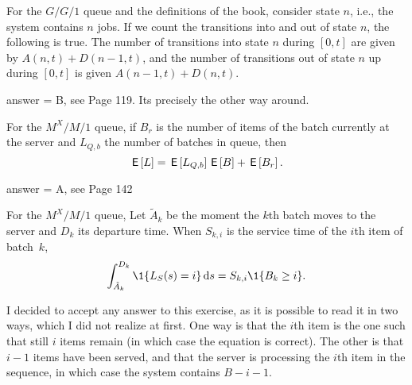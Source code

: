 \begin{exercise}[201804]
For the $G/G/1$ queue and the definitions of the book, consider state $n$, i.e., the system contains $n$ jobs. If we count the transitions into and out of state $n$, the following is true. The number of transitions into state $n$ during $[0,t]$ are given by $A(n,t) + D(n-1,t)$, and the number of transitions out of state $n$ up during $[0,t]$ is given $A(n-1,t) + D(n,t)$.
\begin{solution}
answer = B, see Page 119. Its precisely the other way around. 
\end{solution}
\end{exercise}

\begin{exercise}[201804]For the $M^X/M/1$ queue, if $B_r$ is the number of items of the batch currently at the server and $L_{Q,b}$ the number of batches in queue, then
\begin{equation*}
  \,\mathsf{E}\left[L\right] = \,\mathsf{E}\left[L_{Q,b}\right]\,\mathsf{E}\left[B\right] + \,\mathsf{E}\left[B_r\right].
\end{equation*}
\begin{solution}
answer = A, see Page 142
\end{solution}
\end{exercise}

\begin{exercise}[201804]For the $M^X/M/1$ queue, 
Let $\tilde A_k$ be the moment the $k$th batch moves to the server and $D_k$ its departure time.  When $S_{k,i}$ is the service time of the $i$th item of batch~$k$,  
\begin{equation*}
  \int_{\tilde A_k}^{D_k} \1{L_S(s)=i} \d s = S_{k,i} \1{B_k \geq i}.
\end{equation*}
\begin{solution}
I decided to accept any answer to this exercise, as it is possible to read it in two ways, which I did not realize at first. One way is that the $i$th item is the one such that still $i$ items remain (in which case the equation is correct). The other is that $i-1$ items have been served, and that the server is processing the $i$th item in the sequence, in which case the system contains $B-i-1$.   
\end{solution}
\end{exercise}

